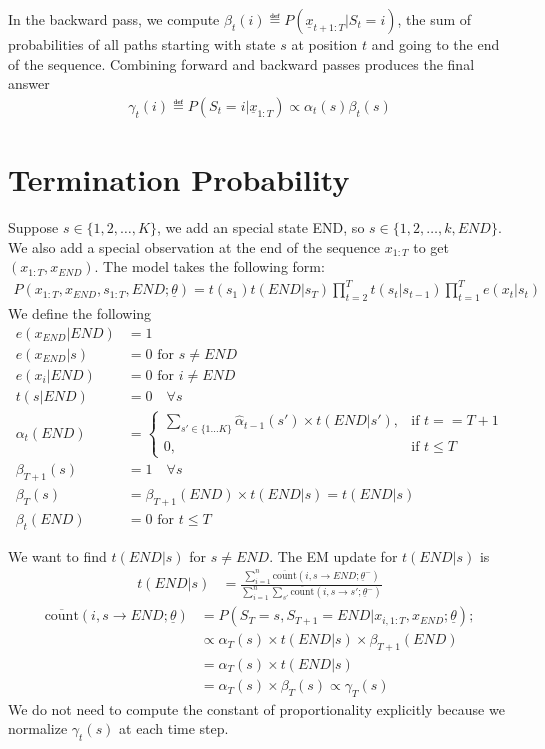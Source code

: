 In the backward pass, we compute $\beta_t(i)\eqdef
P(\underline{x}_{t+1:T}|S_t=i)$, the sum of probabilities of all paths starting
with state $s$ at position $t$ and going to the end of the sequence. Combining
forward and backward passes produces the final answer 
\begin{align*}
\gamma_t(i)\eqdef
P(S_t=i|\underline{x}_{1:T})\propto \alpha_t(s)\beta_t(s)
\end{align*}

\section{Termination Probability}\label{sec:term}
Suppose $s\in \{1, 2, \ldots, K\}$, we add an special state END, so 
$s\in \{1, 2, \ldots, k, END \}$. We also add a special observation at the end
of the sequence $x_{1:T}$ to get $(x_{1:T}, x_{END})$. 
The model takes the following form:
\begin{align*}
P(x_{1:T}, x_{END}, s_{1:T}, END;\underline{\theta}) = 
    t(s_1)t(END|s_T)\prod_{t = 2}^T t(s_t | s_{t-1})\prod_{t = 1}^T e(x_t|s_t)
\end{align*} 
We define the following
\begin{align*}
e(x_{END} | END) &= 1 \\
e(x_{END} | s) &= 0 \text{ for } s\neq END \\
e(x_i | END) &= 0 \text{ for } i \neq END \\
t(s | END) &= 0 \quad \forall s \\
\alpha_t(END) &= 
\begin{cases}
\sum_{s'\in\{1\ldots K\}}\hat\alpha_{t-1}(s')\times t(END|s'), & \text{if } t ==
T + 1
\\
0, & \text{if } t\leq T
\end{cases} \\
\beta_{T + 1}(s) &= 1 \quad \forall s \\
\beta_T(s) &= \beta_{T + 1}(END)\times t(END | s) = t(END | s) \\
\beta_t(END) &= 0 \text{ for } t \leq T
\end{align*}

We want to find $t(END | s)$ for $s\neq END$. The EM update for $t(END|s)$ is
\begin{align*}
t(END|s) &= \frac{\sum_{i = 1}^n \overline{\text{count}}(i, s\rightarrow
END;\underline{\theta}^-)} {\sum_{i = 1}^n\sum_{s'} \overline{
\text{count}}(i, s\rightarrow s';\underline{\theta}^-)} 
\end{align*}
\begin{align*}
\overline{\text{count}}(i, s\rightarrow END;\underline{\theta}) &= P(S_T = s,
S_{T + 1} = END | x_{i, 1:T}, x_{END}; \underline{\theta});\\
    &\propto \alpha_T(s)\times t(END|s)\times \beta_{T +
    1}(END)\\
    &= \alpha_T(s)\times t(END|s)\\
    &= \alpha_T(s)\times \beta_T(s) \propto \gamma_T(s)
\end{align*}
We do not need to compute the constant of proportionality explicitly
because we normalize $\gamma_t(s)$ at each time step.

